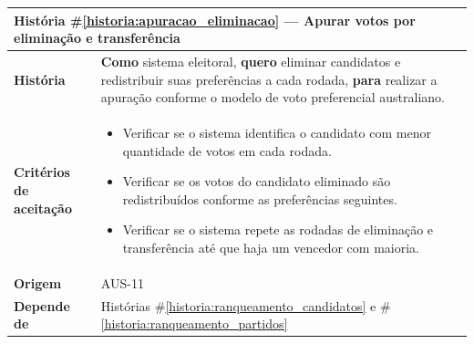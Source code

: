 \documentclass[12pt,a4paper]{article}
\newcounter{historia}
\begin{document}
\label{historia:apuracao_eliminacao}
\begin{table}[H]
    \centering
    \begin{tabular}{|m{4.5cm}|m{11cm}|}
    \hline

    \multicolumn{2}{|l|}{
        \textbf{História \#\ref{historia:apuracao_eliminacao} --- Apurar votos por eliminação e transferência}
    } \\

    \hline

    \textbf{História} &
    \textbf{Como} sistema eleitoral,
    \newline
    \textbf{quero} eliminar candidatos e redistribuir suas preferências a cada rodada,
    \newline
    \textbf{para} realizar a apuração conforme o modelo de voto preferencial australiano. \\

    \textbf{Critérios de aceitação} &
    \begin{itemize}
        \item{Verificar se o sistema identifica o candidato com menor quantidade de votos em cada rodada.}
        \item{Verificar se os votos do candidato eliminado são redistribuídos conforme as preferências seguintes.}
        \item{Verificar se o sistema repete as rodadas de eliminação e transferência até que haja um vencedor com maioria.}
    \end{itemize}\\

    \textbf{Origem} &
    AUS-11 \\

    \textbf{Depende de} &
    Histórias \#\ref{historia:ranqueamento_candidatos} e \#\ref{historia:ranqueamento_partidos} \\

    \hline
    \end{tabular}
\end{table}
\end{document}
